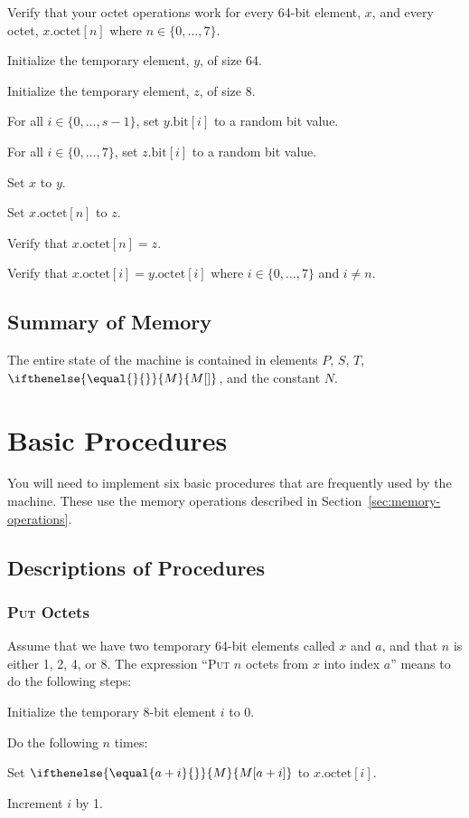 \documentclass[a4paper,12pt]{article}
\newcommand{\MEM}[1]{\ifthenelse{\equal{#1}{}}{M}{M[#1]}}
\newcommand{\PC}{P}
\newcommand{\SP}{S}
\newcommand{\TERM}{T}
\newcommand{\octno}[2]{#1.\mathrm{octet}[#2]}
\newcommand{\bitno}[2]{#1.\mathrm{bit}[#2]}
\newcommand{\range}[2]{\{#1,\ldots,#2\}}
\newcommand{\proc}[1]{\textsc{#1}}
\begin{document}
Verify that your octet operations work for every 64-bit element, $x$, and every octet, $\octno{x}{n}$ where $n \in \range{0}{7}$.
\begin{stepnumbers}
\item Initialize the temporary element, $y$, of size 64.
\item Initialize the temporary element, $z$, of size 8.
\item For all $i \in \range{0}{s-1}$, set $\bitno{y}{i}$ to a random bit value.
\item For all $i \in \range{0}{7}$, set $\bitno{z}{i}$ to a random bit value.
\item Set $x$ to $y$.
\item Set $\octno{x}{n}$ to $z$.
\item Verify that $\octno{x}{n} = z$.
\item Verify that $\octno{x}{i} = \octno{y}{i}$ where $i \in \range{0}{7}$ and $i \neq n$.
\end{stepnumbers}

\subsection{Summary of Memory}

The entire state of the machine is contained in elements $\PC$, $\SP$, $\TERM$, $\MEM{}$, and the constant $N$.

\section{Basic Procedures}

You will need to implement six basic procedures that are frequently used by the machine.
These use the memory operations described in Section~\ref{sec:memory-operations}.

\subsection{Descriptions of Procedures}

\subsubsection{\proc{Put} Octets}

Assume that we have two temporary 64-bit elements called $x$ and $a$, and that $n$ is either 1, 2, 4, or 8.
The expression ``\proc{Put} $n$ octets from $x$ into index $a$'' means to do the following steps:
\begin{stepnumbers}
\item Initialize the temporary 8-bit element $i$ to 0.
\item Do the following $n$ times:
  \begin{stepletters}
  \item Set $\MEM{a+i}$ to $\octno{x}{i}$.
  \item Increment $i$ by 1.
  \end{stepletters}
\end{stepnumbers}
\end{document}
